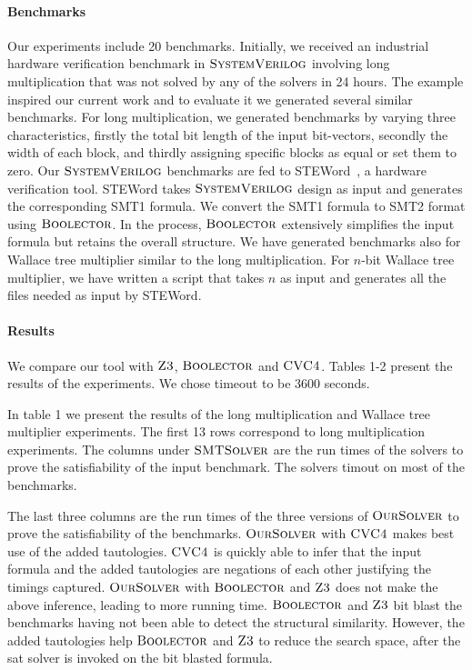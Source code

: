 \paragraph{\bf Benchmarks}
%
Our experiments include 20 benchmarks.
%
Initially, we received an industrial hardware verification benchmark in $\textsc{SystemVerilog}$ involving long multiplication that was not solved by any of the solvers in 24 hours.
%
The example inspired our current work and to evaluate it we generated several similar benchmarks.
%
For long multiplication, we generated benchmarks by varying three characteristics, firstly the total bit length of the input bit-vectors, secondly the width of each block, and thirdly assigning specific blocks as equal or set them to zero.
%
Our $\textsc{SystemVerilog}$ benchmarks are fed to STEWord~\cite{Word-level-Symbolic-Trajectory-Evaluation}, a hardware verification tool.
%
STEWord takes $\textsc{SystemVerilog}$ design as input and generates the corresponding SMT1 formula.
%
We convert the SMT1 formula to SMT2 format using $\textsc{Boolector}$.
%
In the process, $\textsc{Boolector}$ extensively simplifies the input formula but retains the overall structure.
%
We have generated benchmarks also for Wallace tree multiplier similar to the long multiplication.
%
For $n$-bit Wallace tree multiplier, we have written a script that takes $n$ as input and generates all the files needed as input by STEWord.
%

\paragraph{\bf Results}
%
We compare our tool with $\textsc{Z3}$, $\textsc{Boolector}$ and $\textsc{CVC4}$. Tables 1-2 present the results of the experiments. We chose timeout to be 3600 seconds.
%


In table 1 we present the results of the long multiplication and Wallace tree multiplier experiments. The first 13 rows correspond to long multiplication experiments. The columns under $\textsc{SMTSolver}$ are the run times of the solvers to prove the satisfiability of the input benchmark. The solvers timout on most of the benchmarks. 

The last three columns are the run times of the three versions of $\textsc{OurSolver}$ to prove the satisfiability of the benchmarks.
%
$\textsc{OurSolver}$ with $\textsc{CVC4}$ makes best use of the added tautologies. $\textsc{CVC4}$ is quickly able to infer that the input formula and the added tautologies are negations of each other justifying the timings captured. 
$\textsc{OurSolver}$ with $\textsc{Boolector}$ and $\textsc{Z3}$ does not make the above inference, leading to more running time. $\textsc{Boolector}$ and $\textsc{Z3}$ bit blast the benchmarks having not been able to detect the structural similarity. However, the added tautologies help $\textsc{Boolector}$ and $\textsc{Z3}$ to reduce the search space, after the sat solver is invoked on the bit blasted formula.


